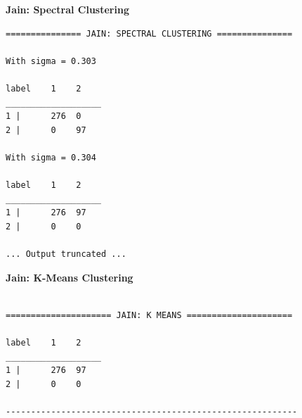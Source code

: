 \documentclass[11pt]{article}
\begin{document}
\textbf{Jain: Spectral Clustering} 
\begin{verbatim}
=============== JAIN: SPECTRAL CLUSTERING ===============

With sigma = 0.303

label    1    2    
___________________
1 |      276  0    
2 |      0    97    

With sigma = 0.304

label    1    2    
___________________
1 |      276  97    
2 |      0    0    

... Output truncated ... 	

\end{verbatim}
\textbf{Jain: K-Means Clustering} 
\begin{verbatim}

===================== JAIN: K MEANS =====================

label    1    2    
___________________
1 |      276  97    
2 |      0    0    

----------------------------------------------------------

\end{verbatim}
\end{document}
